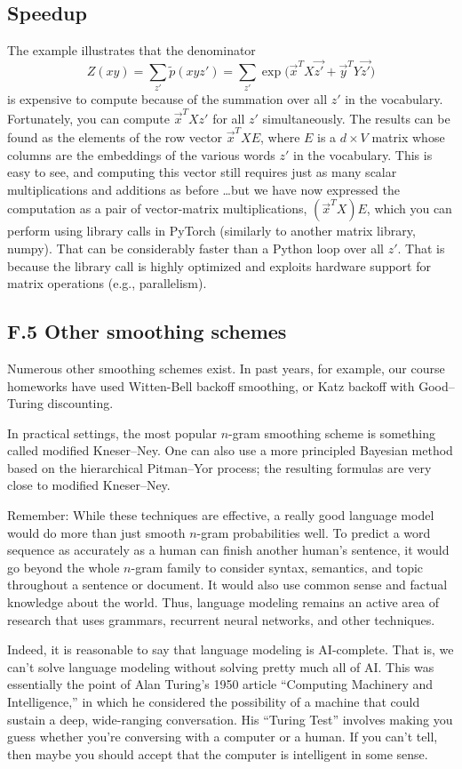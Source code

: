 \subsection*{Speedup}
The example illustrates that the denominator
\[
Z(xy) = \sum_{z'} \tilde{p}(xyz') = \sum_{z'} \exp\big(\vec{x}^T X \vec{z'} + \vec{y}^T Y \vec{z'}\big)
\tag{13}
\]
is expensive to compute because of the summation over all $z'$ in the vocabulary. Fortunately, you can compute $\vec{x}^T X z'$ for all $z'$ simultaneously. The results can be found as the elements of the row vector $\vec{x}^T X E$, where $E$ is a $d \times V$ matrix whose columns are the embeddings of the various words $z'$ in the vocabulary. This is easy to see, and computing this vector still requires just as many scalar multiplications and additions as before \ldots but we have now expressed the computation as a pair of vector-matrix multiplications, $(\vec{x}^T X)E$, which you can perform using library calls in PyTorch (similarly to another matrix library, numpy). That can be considerably faster than a Python loop over all $z'$. That is because the library call is highly optimized and exploits hardware support for matrix operations (e.g., parallelism).

\subsection*{F.5 Other smoothing schemes}
Numerous other smoothing schemes exist. In past years, for example, our course homeworks have used Witten-Bell backoff smoothing, or Katz backoff with Good–Turing discounting.  

In practical settings, the most popular $n$-gram smoothing scheme is something called modified Kneser–Ney. One can also use a more principled Bayesian method based on the hierarchical Pitman–Yor process; the resulting formulas are very close to modified Kneser–Ney.  

Remember: While these techniques are effective, a really good language model would do more than just smooth $n$-gram probabilities well. To predict a word sequence as accurately as a human can finish another human’s sentence, it would go beyond the whole $n$-gram family to consider syntax, semantics, and topic throughout a sentence or document. It would also use common sense and factual knowledge about the world. Thus, language modeling remains an active area of research that uses grammars, recurrent neural networks, and other techniques.  

Indeed, it is reasonable to say that language modeling is AI-complete. That is, we can’t solve language modeling without solving pretty much all of AI. This was essentially the point of Alan Turing’s 1950 article “Computing Machinery and Intelligence,” in which he considered the possibility of a machine that could sustain a deep, wide-ranging conversation. His “Turing Test” involves making you guess whether you’re conversing with a computer or a human. If you can’t tell, then maybe you should accept that the computer is intelligent in some sense.  

